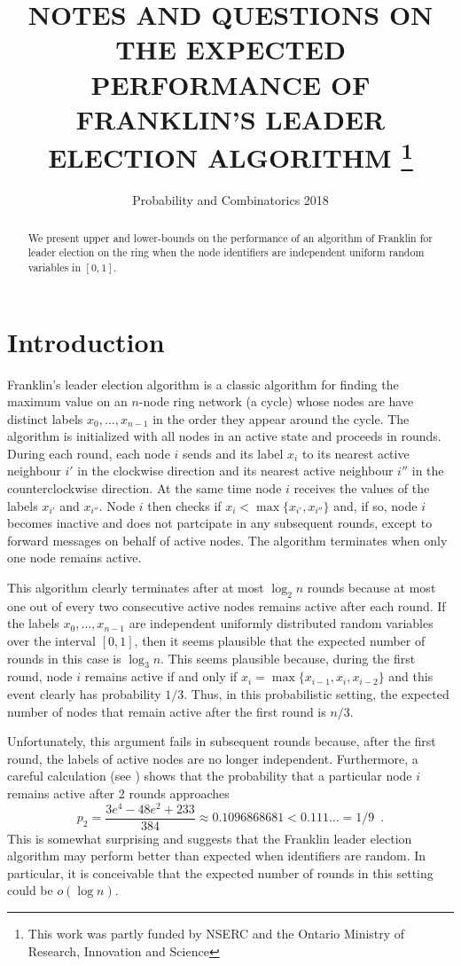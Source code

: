 \documentclass{patmorin}
\title{\MakeUppercase{Notes and Questions on the Expected Performance 
   of Franklin's Leader Election Algorithm}%
   \thanks{This work was partly funded by NSERC and the Ontario Ministry of
    Research, Innovation and Science}}
\author{Probability and Combinatorics 2018}
\begin{document}
\maketitle
%
\begin{abstract}
  We present upper and lower-bounds on the performance of an algorithm
  of Franklin for leader election on the ring when the node identifiers
  are independent uniform random variables in $[0,1]$.
\end{abstract}
%
%


\section{Introduction}

Franklin's leader election algorithm is a classic algorithm for finding
the maximum value on an $n$-node ring network (a cycle) whose nodes
are have distinct labels $x_0,\ldots,x_{n-1}$ in the order they appear
around the cycle.  The algorithm is initialized with all nodes in an
active state and proceeds in rounds.  During each round, each node
$i$ sends and its label $x_i$ to its nearest active neighbour $i'$ in
the clockwise direction and its nearest active neighbour $i''$ in the
counterclockwise direction.  At the same time node $i$ receives the values
of the labels $x_{i'}$ and $x_{i''}$.  Node $i$ then checks if $x_i <
\max\{x_{i'},x_{i''}\}$ and, if so, node $i$ becomes inactive and does
not partcipate in any subsequent rounds, except to forward messages on
behalf of active nodes.  The algorithm terminates when only one node
remains active.

This algorithm clearly terminates after at most $\log_2 n$ rounds because
at most one out of every two consecutive active nodes remains active after
each round.  If the labels $x_0,\ldots,x_{n-1}$ are independent uniformly
distributed random variables over the interval $[0,1]$, then it seems
plausible that the expected number of rounds in this case is $\log_3 n$.
This seems plausible because, during the first round, node $i$ remains
active if and only if $x_i=\max\{x_{i-1},x_i,x_{i-2}\}$ and this event
clearly has probability $1/3$. Thus, in this probabilistic setting,
the expected number of nodes that remain active after the first round
is $n/3$.

Unfortunately, this argument fails in subsequent rounds because,
after the first round, the labels of active nodes are no longer
independent. Furthermore, a careful calculation (see ) shows
that the probability that a particular node $i$ remains active after 2
rounds approaches
\[
    p_2 = \frac{3e^4 - 48e^2 + 233}{384} \approx 0.1096868681 < 0.111\ldots = 1/9 \enspace .
\]
This is somewhat surprising and suggests that the Franklin leader election algorithm may perform better than expected when identifiers are random.  In particular, it is conceivable that the expected number of rounds in this setting could be $o(\log n)$.
\end{document}

